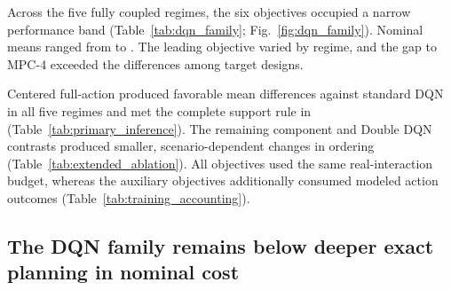 \documentclass[remotesensing,article,submit,moreauthors]{Definitions/mdpi}
\newcommand{\revisedcaption}[1]{\captionsetup{labelfont+={color=red},textfont+={color=red}}\caption{#1}}
\newcommand{\revisedcaption}[1]{\caption{#1}}
\begin{document}
\begin{table}[H]
\centering
\caption{Paired inference for centered full-action minus standard DQN across the five fully coupled regimes. Negative differences favor centered full-action supervision. Each comparison uses 20 model-seed blocks after averaging 20 shared held-out traces. Holm adjustment covers the five prespecified regimes, and LOO denotes the leave-one-seed-out mean range.}
\label{tab:primary_inference}
\resizebox{\textwidth}{!}{}
\end{table}

\begin{table}[H]
\centering
\caption{Training information and computation accounting. Wall time is mean $\pm$ SD across 20 models. ``Modeled action outcomes'' counts analytical action evaluations used by the learning objective. Information and computational budgets additionally reflect these modeled action outcomes.}
\label{tab:training_accounting}
\resizebox{0.92\textwidth}{!}{}
\end{table}

Across the five fully coupled regimes, the six objectives occupied a narrow performance band (Table~\ref{tab:dqn_family}; Fig.~\ref{fig:dqn_family}). Nominal means ranged from \DQNFamilyNominalMinCost{} to \DQNFamilyNominalMaxCost. The leading objective varied by regime, and the gap to MPC-4 exceeded the differences among target designs.

Centered full-action produced favorable mean differences against standard DQN in all five regimes and met the complete support rule in \PrimarySupportedCount{} (Table~\ref{tab:primary_inference}). The remaining component and Double DQN contrasts produced smaller, scenario-dependent changes in ordering (Table~\ref{tab:extended_ablation}). All objectives used the same real-interaction budget, whereas the auxiliary objectives additionally consumed modeled action outcomes (Table~\ref{tab:training_accounting}).

\subsection{The DQN family remains below deeper exact planning in nominal cost}

\begin{table}[H]
\centering
\revisedcaption{Nominal receding-horizon planning over 400 unique held-out traces. Each planner has perfect knowledge of the next $H$ tasks and exogenous link states and exactly enumerates $3^H$ sequences before every action. Runtime was measured on the same workstation and includes only planner action selection after environment construction. The separate matched latency comparison, including DQN inference, is reported in Table~\ref{tab:revision_runtime}.}
\label{tab:planner_depth}
\resizebox{0.85\textwidth}{!}{}
\end{table}
\end{document}
